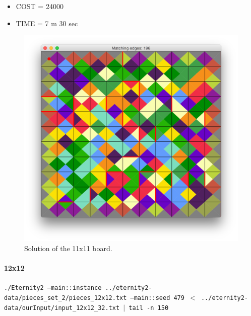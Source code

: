 	\begin{itemize}
		\item COST = 24000
		\item TIME = 7 m 30 sec
	\end{itemize}
	\begin{figure}[H]
	\centering
	\includegraphics[scale=0.25]{img/sol_11x11}
	\caption{Solution of the 11x11 board.}
	\end{figure}



	\paragraph{12x12}
	\texttt{./Eternity2 --main::instance ../eternity2-data/pieces\_set\_2/pieces\_12x12.txt --main::seed 479 $<$ ../eternity2-data/ourInput/input\_12x12\_32.txt $\mid$ tail -n 150}

